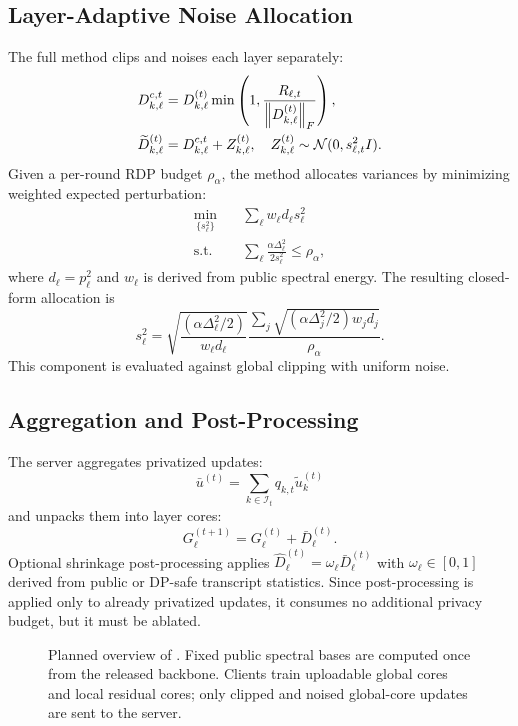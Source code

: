 \subsection{Layer-Adaptive Noise Allocation}
The full method clips and noises each layer separately:
\begin{align}
  D_{k,\ell}^{c,t}
  &=
  D_{k,\ell}^{(t)}
  \min\left(1,\frac{R_{\ell,t}}{\left\lVert D_{k,\ell}^{(t)} \right\rVert_F}\right),\\
  \widetilde{D}_{k,\ell}^{(t)}
  &=
  D_{k,\ell}^{c,t}+Z_{k,\ell}^{(t)},\quad
  Z_{k,\ell}^{(t)}\sim\mathcal{N}(0,s_{\ell,t}^2I).
\end{align}
Given a per-round RDP budget $\rho_{\alpha}$, the method allocates variances by minimizing weighted expected perturbation:
\begin{align}
  \min_{\{s_{\ell}^{2}\}} \quad
  & \sum_{\ell} w_{\ell}d_{\ell}s_{\ell}^{2}\\
  \mathrm{s.t.}\quad
  & \sum_{\ell}\frac{\alpha\Delta_{\ell}^{2}}{2s_{\ell}^{2}}
  \le \rho_{\alpha},
\end{align}
where $d_{\ell}=p_{\ell}^{2}$ and $w_{\ell}$ is derived from public spectral energy. The resulting closed-form allocation is
\begin{equation}
  s_{\ell}^{2} =
  \sqrt{\frac{(\alpha \Delta_{\ell}^{2}/2)}
             {w_{\ell}d_{\ell}}}
  \frac{
  \sum_j \sqrt{(\alpha\Delta_j^2/2)w_jd_j}}
  {\rho_{\alpha}}.
\end{equation}
This component is evaluated against global clipping with uniform noise.

\subsection{Aggregation and Post-Processing}
The server aggregates privatized updates:
\begin{equation}
  \bar{u}^{(t)} = \sum_{k\in\mathcal{I}_t} q_{k,t}\widetilde{u}_k^{(t)}
\end{equation}
and unpacks them into layer cores:
\begin{equation}
  G_{\ell}^{(t+1)} = G_{\ell}^{(t)} + \bar{D}_{\ell}^{(t)}.
\end{equation}
Optional shrinkage post-processing applies $\widehat{D}_{\ell}^{(t)}=\omega_{\ell}\bar{D}_{\ell}^{(t)}$ with $\omega_{\ell}\in[0,1]$ derived from public or DP-safe transcript statistics. Since post-processing is applied only to already privatized updates, it consumes no additional privacy budget, but it must be ablated.

\begin{figure}[t]
  \centering
  
  \caption{Planned overview of \method. Fixed public spectral bases are computed once from the released backbone. Clients train uploadable global cores and local residual cores; only clipped and noised global-core updates are sent to the server.}
  \label{fig:system_overview}
\end{figure}


